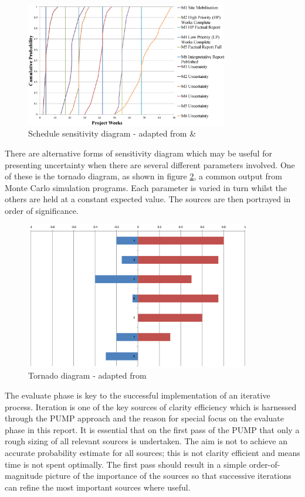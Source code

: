 \begin{figure}[!h]
  \centering
    \includegraphics[width = 0.79\textwidth]{./Figures/ScheduleSensitivity.png} 
\caption{Schedule sensitivity diagram - adapted from \cite{hopkinson2008} \& \cite{chapman} }
\label{Figure:SensDiagGantt}
\end{figure}

There are alternative forms of sensitivity diagram which may be useful for presenting uncertainty when there are several different parameters involved. 
One of these is the tornado diagram, as shown in figure \ref{Figure:Tornado}, a common output from Monte Carlo simulation programs.
Each parameter is varied in turn whilst the others are held at a constant expected value.
The sources are then portrayed in order of significance.

\begin{figure}[!h]
  \centering
    \includegraphics[width = 0.88\textwidth]{./Figures/TornadoFig.png} 
\caption{Tornado diagram - adapted from \cite{hopkinson2008}}
\label{Figure:Tornado}
\end{figure}

The evaluate phase is key to the successful implementation of an iterative process.
Iteration is one of the key sources of clarity efficiency which is harnessed through the PUMP approach and the reason for special focus on the evaluate phase in this report.
It is essential that on the first pass of the PUMP that only a rough sizing of all relevant sources is undertaken.
The aim is not to achieve an accurate probability estimate for all sources; this is not clarity efficient and means time is not spent optimally.
The first pass should result in a simple order-of-magnitude picture of the importance of the sources so that successive iterations can refine the most important sources where useful.

